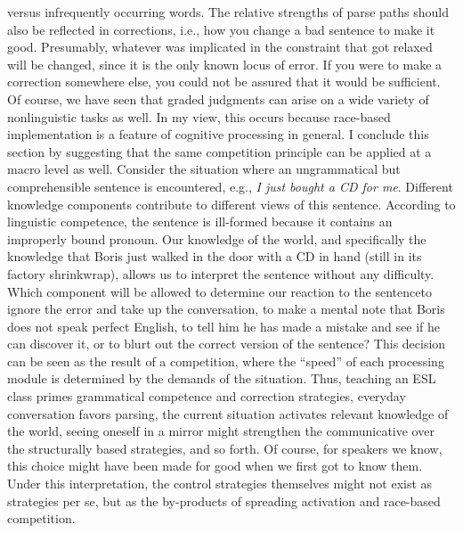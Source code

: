  versus infrequently occurring words. The relative strengths of parse paths should also be reflected in corrections, i.e., how you change a bad sentence to make it good. Presumably, whatever was implicated in the constraint that got relaxed will be changed, since it is the only known locus of error. If you were to make a correction somewhere else, you could not be assured that it would be sufficient. Of course, we have seen that graded judgments can arise on a wide variety of nonlinguistic tasks as well. In my view, this occurs because race-based implementation is a feature of cognitive processing in general. I conclude this section by suggesting that the same competition principle can be applied at a macro level as well. Consider the situation where an ungrammatical but comprehensible sentence is encountered, e.g., \textit{I just bought a CD for me}. Different knowledge components contribute to different views of this sentence. According to linguistic competence, the sentence is ill-formed  because it contains an improperly bound pronoun. Our knowledge of the world, and specifically the knowledge that Boris just walked in the door with a CD in hand (still in its factory shrinkwrap), allows us to interpret the sentence without any difficulty. Which component will be allowed to determine our reaction to the sentence\schdash{}to ignore the error and take up the conversation, to make a mental note that Boris does not speak perfect English, to tell him he has made a mistake and see if he can discover it, or to blurt out the correct version of the sentence? This decision can be seen as the result of a competition, where the ``speed'' of each processing module is determined by the demands of the situation. Thus, teaching an ESL class primes grammatical competence and correction strategies, everyday conversation favors parsing, the current situation activates relevant knowledge of the world, seeing oneself in a mirror might strengthen the communicative over the structurally based strategies, and so forth. Of course, for speakers we know, this choice might have been made for good when we first got to know them. Under this interpretation, the control strategies themselves might not exist as strategies per se, but as the by-products of spreading activation and race-based competition.

